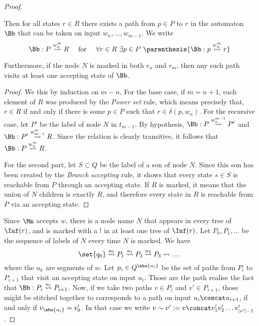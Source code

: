 \begin{proof}
\begin{claim}
        Then for all states $r \in R$ there exists
        a path from $p \in P$ to $r$ in the automaton $\Bb$
        that can be taken on input $w_n, \dots, w_{m-1}$.
        We write
        \[
            \Bb : P \pathto{w_n^m} R
            \quad\text{ for }\quad
            \forall r \in R~
            \exists p \in P~
            \parenthesis{
                \Bb : p \pathto{w_n^m} r
            }
        \]

        Furthermore, if the node $N$ is marked in both $r_n$
        and $r_m$, then any such path visits
        at least one accepting state of $\Bb$.
    \end{claim}
    \begin{proof}
        We this by induction on $m - n$. For the base case,
        if $m = n + 1$, each element of $R$ was produced by the \textit{Power set}
        rule, which means precisely that, $r \in R$ if and only if
        there is some $p \in P$ such that $r \in \delta(p, w_n)$.
        For the recursive case, let $P'$ be the label of node $N$ in
        $t_{m-1}$. By hypothesis, $\Bb : P \pathto{w_n^{m-1}} P'$
        and $\Bb : P' \pathto{w_{m-1}^m} R$. Since the relation is clearly
        transitive, it follows that $\Bb : P \pathto{w_n^m} R$.

        For the second part, let $S \subset Q$
        be the label of a son of node $N$. Since this son
        has been created by the \textit{Branch accepting} rule,
        it shows that every state $s \in S$ is reachable from $P$
        through an accepting state. If $R$ is marked, it means
        that the union of $N$ children is exactly $R$, and therefore
        every state in $R$ is reachable from $P$ via an accepting state.
    \end{proof}

    Since $\Mm$ accepts $w$,
    there is a node name $N$ that appears in every
    tree of $\Inf(r)$, and is marked with a $!$ in
    at least one tree of $\Inf(r)$.
    Let $P_0, P_1, \dots$ be the sequence of labels of $N$
    every time $N$ is marked. We have
    \[
        \set{q_0} \pathto{u_0} P_1 \pathto{u_1} P_2 \pathto{u_2} P_3 \pathto{} \dots
    \]
    where the $u_k$ are segments of $w$.
    Let $p_i \in Q^{\abs{u_i}}$ be the set of paths from $P_i$ to $P_{i+1}$
    that visit an accepting state on input $u_i$.
    Those are the path realise the fact that $\Bb : P_i \pathto{u_i} P_{i+1}$.
    Now, if we take two paths $v \in P_i$ and $v' \in P_{i+1}$,
    those might be stitched together to corresponds to
    a path on input $u_i \concat u_{i+1}$, if and only if
    $v_{\abs{u_i}} = v'_0$. In that case we write $v \sim v' :=
    v \concat v'_1 v'_2 \dots v'_{|v'|-1}$.


\end{proof}
